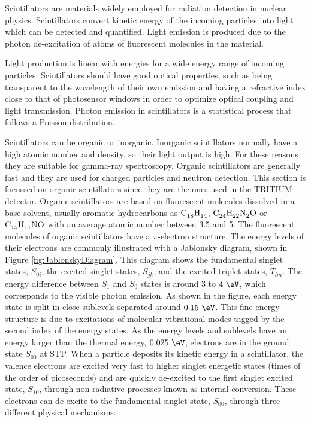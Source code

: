 Scintillators are materials widely employed for radiation detection in nuclear physics. Scintillators convert kinetic energy of the incoming particles into light which can be detected and quantified. Light emission is produced due to the photon de-excitation of atoms of fluorescent molecules in the material.

Light production is linear with energies for a wide energy range of incoming particles. Scintillators should have good optical properties, such as being transparent to the wavelength of their own emission and having a refractive index close to that of photosensor windows in order to optimize optical coupling and light transmission. Photon emission in scintillators is a statistical process that follows a Poisson distribution.

Scintillators can be organic or inorganic. Inorganic scintillators normally have a high atomic number and density, so their light output is high. For these reasons they are suitable for gamma-ray spectroscopy. Organic scintillators are generally fast and they are used for charged particles and neutron detection. This section is focussed on organic scintillators since they are the ones used in the TRITIUM detector. Organic scintillators are based on fluorescent molecules dissolved in a base solvent, usually aromatic hydrocarbons as $\ce{C_{18}H_{14}}$, $\ce{C_{24}H_{22}N_{2}O}$ or $\ce{C_{15}H_{11}NO}$ with an average atomic number between 3.5 and 5. The fluorescent molecules of organic scintillators have a $\pi$-electron structure. The energy levels of their electrons are commonly illustrated with a Jablonsky diagram, shown in Figure \ref{fig:JablonskyDiagram}. This diagram shows the fundamental singlet states, $S_{0i}$, the excited singlet states, $S_{jk}$, and the excited triplet states, $T_{lm}$. The energy difference between $S_1$ and $S_0$ states is around $3$ to $4~\eV$, which corresponds to the visible photon emission. As shown in the figure, each energy state is split in close sublevels separated around $0.15~\eV$. This fine energy structure is due to excitations of molecular vibrational modes tagged by the second index of the energy states. As the energy levels and sublevels have an energy larger than the thermal energy, $0.025~\eV$, electrons are in the ground state $S_{00}$ at STP. When a particle deposits its kinetic energy in a scintillator, the valence electrons are excited very fast to higher singlet energetic states (times of the order of picoseconds) and are quickly de-excited to the first singlet excited state, $S_{10}$, through non-radiative processes known as internal conversion. These electrons can de-excite to the fundamental singlet state, $S_{00}$, through three different physical mechanisms:

